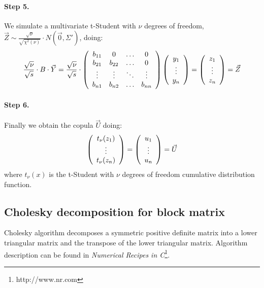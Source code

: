 \documentclass[a4paper,12pt,final]{article}
\begin{document}
\paragraph{Step 5.} We simulate a multivariate t-Student with $\nu$ degrees of freedom, 
$\vec{Z} \sim \frac{\sqrt{\nu}}{\sqrt{\chi^2(\nu)}} \cdot N(\vec{0}, \Sigma')$, doing:
\begin{displaymath}
\frac{\sqrt{\nu}}{\sqrt{s}} \cdot B \cdot \vec{Y} 
=
\frac{\sqrt{\nu}}{\sqrt{s}} \cdot 
\left(
\begin{array}{cccc}
b_{11}   & 0        & \ldots & 0       \cr
b_{21}   & b_{22}   & \ldots & 0       \cr
\vdots  & \vdots  & \ddots & \vdots \cr
b_{n1}   & b_{n2}   & \ldots & b_{nn}
\end{array}
\right)
\left(
\begin{array}{c}
y_1 \cr
\vdots \cr
y_n
\end{array}
\right) 
=
\left(
\begin{array}{c}
z_1 \cr
\vdots \cr
z_n
\end{array}
\right) 
= 
\vec{Z}
\end{displaymath}

\paragraph{Step 6.} Finally we obtain the copula $\vec{U}$ doing:
\begin{displaymath}
\left(
\begin{array}{c}
t_\nu(z_1) \cr
\vdots \cr
t_\nu(z_n)
\end{array}
\right) 
=
\left(
\begin{array}{c}
u_1 \cr
\vdots \cr
u_n
\end{array}
\right) 
=
\vec{U} 
\end{displaymath}
where $t_\nu(x)$ is the t-Student with $\nu$ degrees of freedom cumulative distribution 
function.

\subsection{Cholesky decomposition for block matrix}
\label{ap:cholblock}

Cholesky algorithm decomposes a symmetric positive definite matrix into a lower
triangular matrix and the transpose of the lower triangular matrix. Algorithm 
description can be found in \emph{Numerical Recipes in C}\footnote{http://www.nr.com}.
\end{document}
